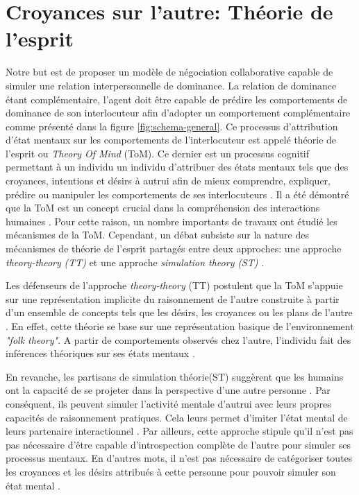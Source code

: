 \section{Croyances sur l'autre: Théorie de l'esprit}
Notre but est de proposer un modèle de négociation collaborative capable de simuler une relation interpersonnelle de dominance. La relation de dominance étant complémentaire, l'agent doit être capable de prédire les comportements de dominance de son interlocuteur afin d'adopter un comportement complémentaire comme présenté dans la figure \ref{fig:schema-general}. 
Ce processus d'attribution d'état mentaux sur les comportements de l'interlocuteur est appelé théorie de l'esprit ou \emph{Theory Of Mind} (ToM). Ce dernier est un processus cognitif permettant à un individu un individu d'attribuer des états mentaux tels que des croyances, intentions et désirs à autrui afin de mieux comprendre, expliquer, prédire ou manipuler les comportements de ses interlocuteurs \cite{harbers2012modeling}. Il a été démontré que la ToM est un concept crucial dans la compréhension des interactions humaines \cite{whiten1991natural,byom2013theory}. Pour cette raison, un nombre importants de travaux ont étudié les mécanismes de la ToM. Cependant, un débat subsiste sur la nature des mécanismes de théorie de l’esprit partagés entre deux approches: une approche \textit{theory-theory}  \emph{(TT)} et une approche \textit{simulation theory} \emph{(ST)} \cite{harbers2012modeling,shanton2010simulation}.

Les défenseurs de l'approche \textit{theory-theory} (TT) postulent que la ToM s’appuie sur une représentation implicite du raisonnement de l'autre construite à partir d'un ensemble de concepts tels que les désirs, les croyances ou les plans de l'autre \cite{harbers2012modeling}. En effet, cette théorie se base sur une représentation basique de l'environnement \emph{"folk theory"}. A partir de comportements observés chez l'autre, l'individu fait des inférences théoriques sur ses états mentaux \cite{shanton2010simulation}.

En revanche, les partisans de simulation théorie(ST) suggèrent que les humains ont la capacité de se projeter dans la perspective d'une autre personne \cite{shanton2010simulation}.
Par conséquent, ils peuvent simuler l'activité mentale d'autrui avec leurs propres capacités de raisonnement pratiques. Cela leurs permet d'imiter l'état mental de leurs partenaire interactionnel \cite{harbers2009modeling}.
Par ailleurs, cette approche stipule qu'il n'est pas pas nécessaire d'être capable d'introspection complète de l'autre pour simuler ses processus mentaux. En d'autres mots, il n'est pas nécessaire de catégoriser toutes les croyances et les désirs attribués à cette personne pour pouvoir simuler son état mental \cite{harbers2012modeling}.

